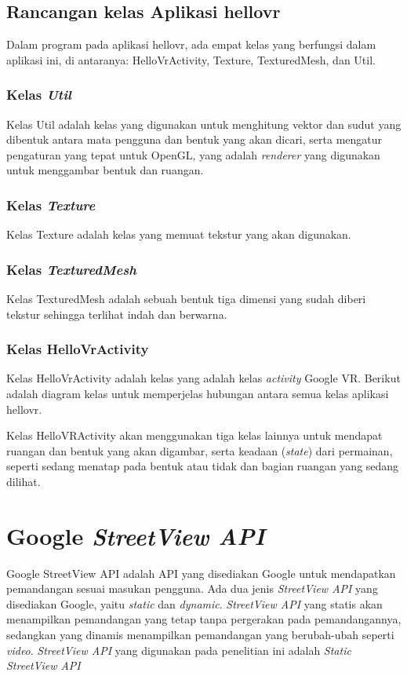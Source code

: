 \subsection{Rancangan kelas Aplikasi hellovr}
\label{subs:rancangan}
Dalam program pada aplikasi hellovr, ada empat kelas yang berfungsi dalam aplikasi ini, di antaranya: HelloVrActivity, Texture, TexturedMesh, dan Util. 

\subsubsection{Kelas {\it Util}}
Kelas Util adalah kelas yang digunakan untuk menghitung vektor dan sudut yang dibentuk antara mata pengguna dan bentuk yang akan dicari, serta mengatur pengaturan yang tepat untuk OpenGL, yang adalah {\it renderer} yang digunakan untuk menggambar bentuk dan ruangan.


\subsubsection{Kelas {\it Texture}}
Kelas Texture adalah kelas yang memuat tekstur yang akan digunakan. 


\subsubsection{Kelas {\it TexturedMesh}}
Kelas TexturedMesh adalah sebuah bentuk tiga dimensi yang sudah diberi tekstur sehingga terlihat indah dan berwarna. 

\subsubsection{Kelas HelloVrActivity}
Kelas HelloVrActivity adalah kelas yang adalah kelas {\it activity} Google VR. Berikut adalah diagram kelas untuk memperjelas hubungan antara semua kelas aplikasi hellovr.

Kelas HelloVRActivity akan menggunakan tiga kelas lainnya untuk mendapat ruangan dan bentuk yang akan digambar, serta keadaan ({\it state}) dari permainan, seperti sedang menatap pada bentuk atau tidak dan bagian ruangan yang sedang dilihat.
 

\section{Google \it{StreetView API}}
\label{sec:streetview}
Google StreetView API adalah API yang disediakan Google untuk mendapatkan pemandangan sesuai masukan pengguna. Ada dua jenis {\it StreetView API} yang disediakan Google, yaitu {\it static} dan {\it dynamic}. {\it StreetView API} yang statis akan menampilkan pemandangan yang tetap tanpa pergerakan pada pemandangannya, sedangkan yang dinamis menampilkan pemandangan yang berubah-ubah seperti {\it video}. {\it StreetView API} yang digunakan pada penelitian ini adalah {\it Static StreetView API} 

